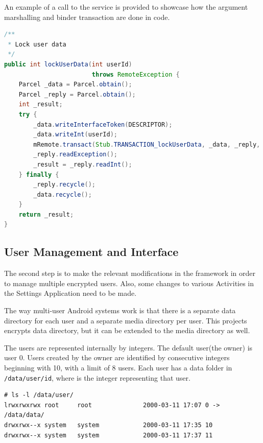 An example of a call to the service is provided to showcase how the argument marshalling and binder transaction are done in code.

\begin{minipage}{\linewidth}
\begin{lstlisting}[language=Java, caption=lockUserData service method, label=lst:lock-user-data-multi-user]
/**
 * Lock user data
 */
public int lockUserData(int userId)
                        throws RemoteException {
	Parcel _data = Parcel.obtain();
	Parcel _reply = Parcel.obtain();
	int _result;
	try {
		_data.writeInterfaceToken(DESCRIPTOR);
		_data.writeInt(userId);
		mRemote.transact(Stub.TRANSACTION_lockUserData, _data, _reply, 0);
		_reply.readException();
		_result = _reply.readInt();
	} finally {
		_reply.recycle();
		_data.recycle();
	}
	return _result;
}
\end{lstlisting}
\end{minipage}

\subsection{User Management and Interface}
\label{sub-sec:user-mngmt-inter-multi-user}

The second step is to make the relevant modifications in the framework in order to manage multiple encrypted users. Also, some changes to various Activities in the Settings Application need to be made.

The way multi-user Android systems work is that there is a separate data directory for each user and a separate media directory per user. This projects encrypts data directory, but it can be extended to the media directory as well.

The users are represented internally by integers. The default user(the owner) is user 0. Users created by the owner are identified by consecutive integers beginning with 10, with a limit of 8 users. Each user has a data folder in \texttt{/data/user/id}, where  is the integer representing that user.

\begin{minipage}{\linewidth}
\begin{lstlisting}[numbers=none, caption=User Data Directories, label=lst:usr-data-multi-user]
# ls -l /data/user/                                             
lrwxrwxrwx root     root              2000-03-11 17:07 0 -> /data/data/
drwxrwx--x system   system            2000-03-11 17:35 10
drwxrwx--x system   system            2000-03-11 17:37 11
\end{lstlisting}
\end{minipage}

